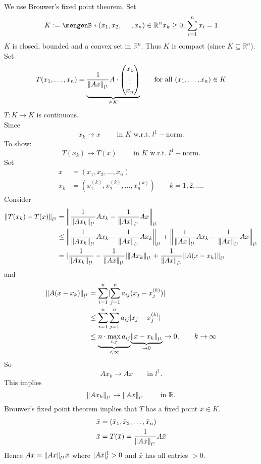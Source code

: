 \begin{beweis}
We use Brouwer's fixed point theorem. Set \[
	K := \set[(x_1,x_2,\dots,x_n) \in \mathbb{R}^n]{x_k \geq 0, \, \sum^{n}_{i=1} x_i = 1}
\]	
$K$ is closed, bounded and a convex set in $\mathbb{R}^n$. Thus $K$ is compact (since $K \subseteq \mathbb{R}^n$). Set
\[
	T(x_1,\dots,x_n) = \underset{\in K}{\underbrace{\frac{1}{\norm{Ax}_{l^1}}A \cdot \begin{pmatrix}
		x_1 \\ \vdots \\ x_n
	\end{pmatrix}}} \qquad \text{for all }(x_1,\dots,x_n) \in K
\]
$T: K \to K$ is continuous. \\
Since
\[
	x_k \to x \qquad \text{ in } K \text{ w.r.t. }l^1-\text{norm}.
\]
To show:
\[
	T(x_k) \to T(x) \qquad \text{ in } K \text{ w.r.t. }l^1-\text{norm}.
\]
Set
\begin{align*}
	x &= (x_1,x_2, \dots,x_n) \\
	x_k &= (x_1^{(k)},x_2^{(k)}, \dots, x_n^{(k)}) \qquad k = 1,2,\dots.
\end{align*}
Consider
\begin{align*}
	\norm{T(x_k)-T(x)}_{l^1} &= \norm{ \frac{1}{\norm{Ax_k}_{l^1}} A x_k - \frac{1}{\norm{Ax}_{l^1}} A x }_{l^1} \\
	&\leq  \norm{\frac{1}{\norm{Ax_k}_{l^1}} A x_k - \frac{1}{\norm{Ax}_{l^1}} A x_k}_{l^1} + \norm{\frac{1}{\norm{Ax}_{l^1}} A x_k - \frac{1}{\norm{Ax}_{l^1}} A x}_{l^1} \\
	&= \abs{\frac{1}{\norm{Ax_k}_{l^1}} - \frac{1}{\norm{Ax}_{l^1}}} \norm{A x_k}_{l^1} + \frac{1}{\norm{Ax}_{l^1}} \norm{A(x -x_k)}_{l^1}
\end{align*}
and
\begin{align*}
	\norm{A(x-x_k)}_{l^1} &= \sum^{n}_{i=1} \abs{ \sum^{n}_{j=1} a_{ij}(x_j-x_j^{(k)})} \\
	&\leq  \sum^{n}_{i=1} \sum^{n}_{j=1} a_{ij} \abs{x_j-x_j^{(k)}} \\
	&\leq \underset{< \infty}{\underbrace{n \cdot \max\limits_{i,j} a_{ij}}} \underset{\to 0}{\underbrace{\norm{x-x_k}_{l^1}}} \to 0, \qquad k \to \infty
\end{align*}
So \[
	Ax_k \to Ax \qquad \text{in }l^1.
\]
This implies
\[
	\norm{Ax_k}_{l^1} \to \norm{Ax}_{l^1} \qquad \text{ in }\mathbb{R}.
\]
Brouwer's fixed point theorem implies that $T$ has a fixed point $\bar{x} \in K$.
\begin{align*}
	\bar{x} &= (\bar{x}_1,\bar{x}_2,\dots,\bar{x}_n) \\
	\bar{x} &= T(\bar{x}) = \frac{1}{\norm{A \bar{x}}_{l^1}} A \bar{x} 
\end{align*}
Hence
$A \bar{x} = \norm{ A \bar{x}}_{l^1} \bar{x}$ where $\lvert A \bar{x}\rvert_l^1 >0$ and $\bar{x}$ has all entries $>0$.
\end{beweis}

